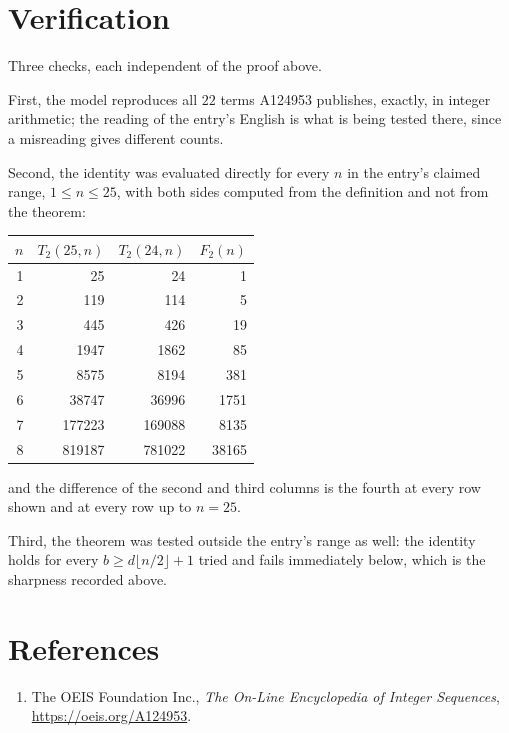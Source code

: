 \documentclass[11pt,a4paper]{article}
\theoremstyle{plain}
\theoremstyle{definition}
\begin{document}
\section{Verification}

Three checks, each independent of the proof above.

First, the model reproduces all $22$ terms A124953 publishes, exactly, in integer
arithmetic; the reading of the entry's English is what is being tested there, since a
misreading gives different counts.

Second, the identity was evaluated directly for every $n$ in the entry's claimed range,
$1\le n\le25$, with both sides computed from the definition and not from the theorem:

\begin{center}
\begin{tabular}{rrrr}
$n$ & $T_{2}(25,n)$ & $T_{2}(24,n)$ & $F_{2}(n)$ \\ \hline
1 & 25 & 24 & 1 \\
2 & 119 & 114 & 5 \\
3 & 445 & 426 & 19 \\
4 & 1947 & 1862 & 85 \\
5 & 8575 & 8194 & 381 \\
6 & 38747 & 36996 & 1751 \\
7 & 177223 & 169088 & 8135 \\
8 & 819187 & 781022 & 38165 \\
\end{tabular}
\end{center}

\noindent and the difference of the second and third columns is the fourth at every row shown
and at every row up to $n=25$.

Third, the theorem was tested outside the entry's range as well: the identity holds for every
$b\ge d\lfloor n/2\rfloor+1$ tried and fails immediately below, which is the sharpness recorded
above.

\section*{References}
\begin{enumerate}
\item The OEIS Foundation Inc., \emph{The On-Line Encyclopedia of Integer Sequences},
\url{https://oeis.org/A124953}.
\end{enumerate}
\end{document}
